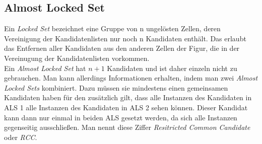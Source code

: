 \newpage
\subsection{Almost Locked Set}
Ein \textit{Locked Set} bezeichnet eine Gruppe von n ungelösten Zellen, deren Vereinigung der Kandidatenlisten nur noch n Kandidaten enthält. Das erlaubt das Entfernen aller Kandidaten aus den anderen Zellen der Figur, die in der Vereinugung der Kandidatenlisten vorkommen.\\
Ein \textit{Almost Locked Set} hat $n+1$ Kandidaten und ist daher einzeln nicht zu gebrauchen. Man kann allerdings Informationen erhalten, indem man zwei \textit{Almost Locked Sets} kombiniert. Dazu müssen sie mindestens einen gemeinsamen Kandidaten haben für den zusätzlich gilt, dass alle Instanzen des Kandidaten in ALS 1 alle Instanzen des Kandidaten in ALS 2 sehen können. Dieser Kandidat kann dann nur einmal in beiden ALS gesetzt werden, da sich alle Instanzen gegenseitig ausschließen. Man nennt diese Ziffer \textit{Resitricted Common Candidate} oder \textit{RCC}.